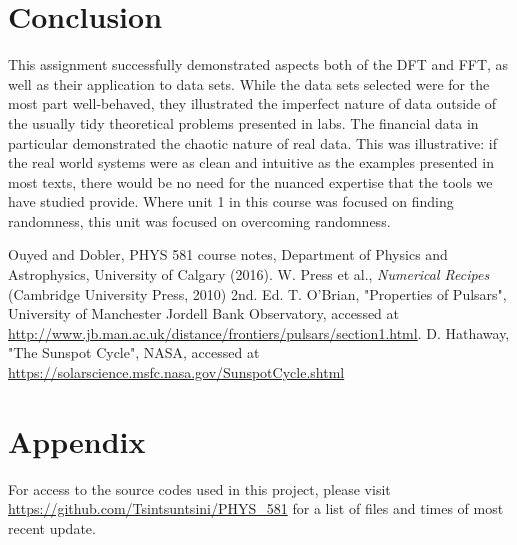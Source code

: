 \documentclass[twocolumn]{article}
\begin{document}
\section{Conclusion}
This assignment successfully demonstrated aspects both of the DFT and FFT, as well as their application to data sets. While the data sets selected were for the most part well-behaved, they illustrated the imperfect nature of data outside of the usually tidy theoretical problems presented in labs. The financial data in particular demonstrated the chaotic nature of real data. This was illustrative: if the real world systems were as clean and intuitive as the examples presented in most texts, there would be no need for the nuanced expertise that the tools we have studied provide. Where unit 1 in this course was focused on finding randomness, this unit was focused on overcoming randomness.


\begin{thebibliography}{00}
	Ouyed and Dobler, PHYS 581 course notes, Department of Physics and Astrophysics, University of Calgary (2016).
	W. Press et al., \emph{Numerical Recipes} (Cambridge University Press, 2010) 2nd. Ed.
	T. O'Brian, "Properties of Pulsars", University of Manchester Jordell Bank Observatory, accessed at \url{http://www.jb.man.ac.uk/distance/frontiers/pulsars/section1.html}.
	D. Hathaway, "The Sunspot Cycle",  NASA, accessed at \url{ https://solarscience.msfc.nasa.gov/SunspotCycle.shtml}
\end{thebibliography}

\section{Appendix}
For access to the source codes used in this project, please visit \url{https://github.com/Tsintsuntsini/PHYS_581} for a list of files and times of most recent update.
	
\end{document}
